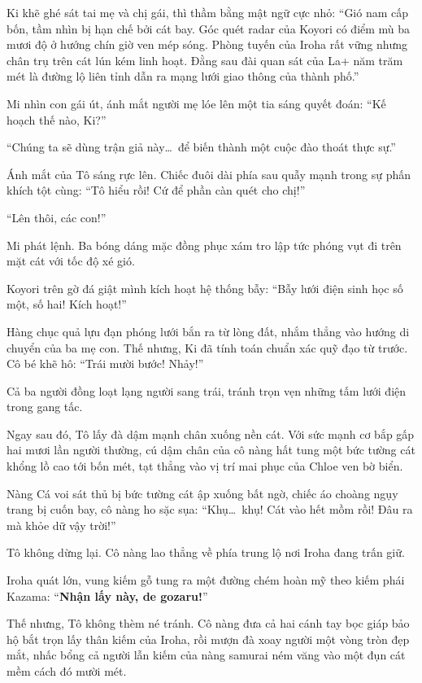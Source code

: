 \documentclass[../main.tex]{subfiles}
\begin{document}
Ki khẽ ghé sát tai mẹ và chị gái, thì thầm bằng mật ngữ cực nhỏ: ``Gió nam cấp bốn, tầm nhìn bị hạn chế bởi cát bay. Góc quét radar của Koyori có điểm mù ba mươi độ ở hướng chín giờ ven mép sóng. Phòng tuyến của Iroha rất vững nhưng chân trụ trên cát lún kém linh hoạt. Đằng sau đài quan sát của La+ năm trăm mét là đường lộ liên tỉnh dẫn ra mạng lưới giao thông của thành phố.''

Mi nhìn con gái út, ánh mắt người mẹ lóe lên một tia sáng quyết đoán: ``Kế hoạch thế nào, Ki?''

``Chúng ta sẽ dùng trận giả này\dots\ để biến thành một cuộc đào thoát thực sự.''

Ánh mắt của Tô sáng rực lên. Chiếc đuôi dài phía sau quẫy mạnh trong sự phấn khích tột cùng: ``Tô hiểu rồi! Cứ để phần càn quét cho chị!''

``Lên thôi, các con!''

Mi phát lệnh. Ba bóng dáng mặc đồng phục xám tro lập tức phóng vụt đi trên mặt cát với tốc độ xé gió.

Koyori trên gờ đá giật mình kích hoạt hệ thống bẫy: ``Bẫy lưới điện sinh học số một, số hai! Kích hoạt!''

Hàng chục quả lựu đạn phóng lưới bắn ra từ lòng đất, nhắm thẳng vào hướng di chuyển của ba mẹ con. Thế nhưng, Ki đã tính toán chuẩn xác quỹ đạo từ trước. Cô bé khẽ hô: ``Trái mười bước! Nhảy!''

Cả ba người đồng loạt lạng người sang trái, tránh trọn vẹn những tấm lưới điện trong gang tấc.

Ngay sau đó, Tô lấy đà dậm mạnh chân xuống nền cát. Với sức mạnh cơ bắp gấp hai mươi lần người thường, cú dậm chân của cô nàng hất tung một bức tường cát khổng lồ cao tới bốn mét, tạt thẳng vào vị trí mai phục của Chloe ven bờ biển.

Nàng Cá voi sát thủ bị bức tường cát ập xuống bất ngờ, chiếc áo choàng ngụy trang bị cuốn bay, cô nàng ho sặc sụa: ``Khụ\dots\ khụ! Cát vào hết mồm rồi! Đâu ra mà khỏe dữ vậy trời!''

Tô không dừng lại. Cô nàng lao thẳng về phía trung lộ nơi Iroha đang trấn giữ.

Iroha quát lớn, vung kiếm gỗ tung ra một đường chém hoàn mỹ theo kiếm phái Kazama: ``\textbf{Nhận lấy này, de gozaru!}''

Thế nhưng, Tô không thèm né tránh. Cô nàng đưa cả hai cánh tay bọc giáp bảo hộ bắt trọn lấy thân kiếm của Iroha, rồi mượn đà xoay người một vòng tròn đẹp mắt, nhấc bổng cả người lẫn kiếm của nàng samurai ném văng vào một đụn cát mềm cách đó mười mét.
\end{document}
